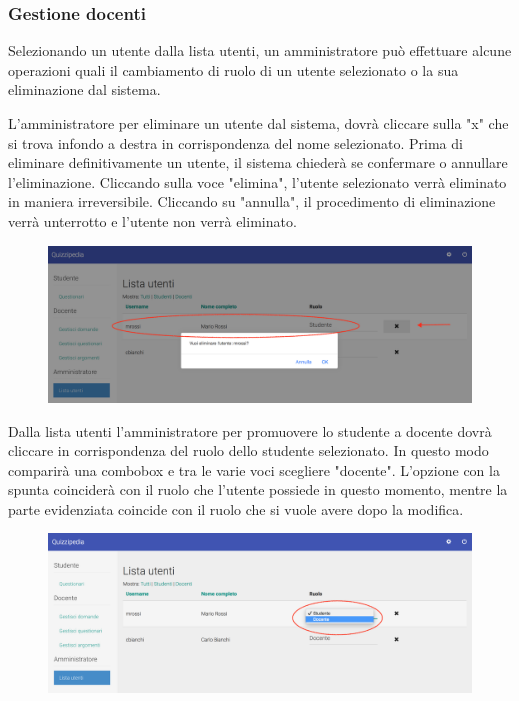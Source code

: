 \documentclass[12pt,a4paper]{article}
\begin{document}
	\subsubsection{Gestione docenti}
	Selezionando un utente dalla lista utenti, un amministratore può effettuare alcune operazioni quali  il cambiamento di ruolo di un utente selezionato o la sua eliminazione dal sistema.
		
	L'amministratore per eliminare un utente dal sistema, dovrà cliccare sulla "x" che si trova infondo a destra  in corrispondenza del nome selezionato. Prima di eliminare definitivamente un utente, il sistema chiederà se confermare o annullare l'eliminazione. Cliccando sulla voce "elimina", l'utente selezionato verrà eliminato in maniera irreversibile. Cliccando su "annulla", il procedimento di eliminazione verrà unterrotto e l'utente non verrà eliminato.
		\begin{figure}[H]
			\centering
			\includegraphics[width=1\linewidth]{../img/screenshot/rimozioneUtente.png}
			\caption{}
			\label{Rimozione utente}
		\end{figure}
	Dalla lista utenti l'amministratore per promuovere lo studente a docente dovrà cliccare in corrispondenza del ruolo dello studente selezionato. In questo modo comparirà una combobox e tra le varie voci scegliere "docente". L'opzione con la spunta coinciderà con il ruolo che l'utente possiede in questo momento, mentre la parte evidenziata coincide con il ruolo che si vuole avere dopo la modifica.
	
	\begin{figure}[H]
		\centering
		\includegraphics[width=1\linewidth]{../img/screenshot/cambioRuoloStudDoc.png}
		\caption{}
		\label{Promozione a ruolo docente}
	\end{figure}
	
\end{document}

